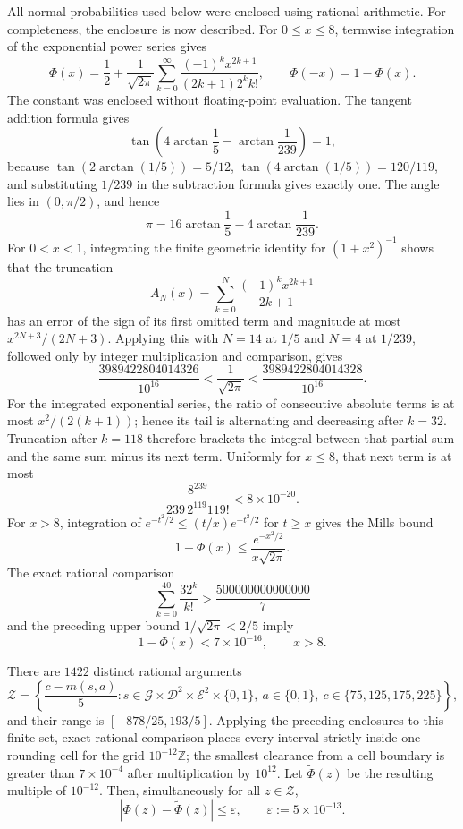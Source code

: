 All normal probabilities used below were enclosed using rational
arithmetic.  For completeness, the enclosure is now described.  For
\(0\le x\le8\), termwise integration of the exponential power series
gives
\[
 \Phi(x)=\frac12+\frac1{\sqrt{2\pi}}
 \sum_{k=0}^{\infty}\frac{(-1)^kx^{2k+1}}{(2k+1)2^kk!},
 \qquad \Phi(-x)=1-\Phi(x).
\]
The constant was enclosed without floating-point evaluation.  The
tangent addition formula gives
\[
 \tan\!\left(4\arctan\frac15-\arctan\frac1{239}\right)=1,
\]
because \(\tan(2\arctan(1/5))=5/12\),
\(\tan(4\arctan(1/5))=120/119\), and substituting
\(1/239\) in the subtraction formula gives exactly one.  The angle
lies in \((0,\pi/2)\), and hence
\[
 \pi=16\arctan\frac15-4\arctan\frac1{239}.
\]
For \(0<x<1\), integrating the finite geometric identity for
\((1+x^2)^{-1}\) shows that the truncation
\[
 A_N(x)=\sum_{k=0}^N\frac{(-1)^kx^{2k+1}}{2k+1}
\]
has an error of the sign of its first omitted term and magnitude at
most \(x^{2N+3}/(2N+3)\).  Applying this with \(N=14\) at \(1/5\)
and \(N=4\) at \(1/239\), followed only by integer multiplication and
comparison, gives
\[
 \frac{3989422804014326}{10^{16}}
 <\frac1{\sqrt{2\pi}}<
 \frac{3989422804014328}{10^{16}}.
\]
For the integrated exponential series, the ratio of consecutive
absolute terms is at most \(x^2/(2(k+1))\); hence its tail is
alternating and decreasing after \(k=32\).  Truncation after \(k=118\)
therefore brackets the integral between that partial sum and the same
sum minus its next term.  Uniformly for \(x\le8\), that next term is at
most
\[
 \frac{8^{239}}{239\,2^{119}119!}<8\times10^{-20}.
\]
For \(x>8\), integration of
\(e^{-t^2/2}\le(t/x)e^{-t^2/2}\) for \(t\ge x\) gives the Mills bound
\[
 1-\Phi(x)\le\frac{e^{-x^2/2}}{x\sqrt{2\pi}}.
\]
The exact rational comparison
\[
 \sum_{k=0}^{40}\frac{32^k}{k!}>
 \frac{500000000000000}{7}
\]
and the preceding upper bound \(1/\sqrt{2\pi}<2/5\) imply
\[
 1-\Phi(x)<7\times10^{-16},\qquad x>8.
\]

There are \(1422\) distinct rational arguments
\[
 \mathcal Z=\left\{\frac{c-m(s,a)}5:
 s\in\mathcal G\times\mathcal D^2\times\mathcal E^2\times\{0,1\},
 \ a\in\{0,1\},\ c\in\{75,125,175,225\}\right\},
\]
and their range is \([-878/25,193/5]\).  Applying the preceding
enclosures to this finite set, exact rational comparison places every
interval strictly inside one rounding cell for the grid
\(10^{-12}\mathbb Z\); the smallest clearance from a cell boundary is
greater than \(7\times10^{-4}\) after multiplication by \(10^{12}\).
Let \(\widetilde\Phi(z)\) be the resulting multiple of \(10^{-12}\).
Then, simultaneously for all \(z\in\mathcal Z\),
\[
 |\Phi(z)-\widetilde\Phi(z)|\le\varepsilon,
 \qquad \varepsilon:=5\times10^{-13}.
\]

